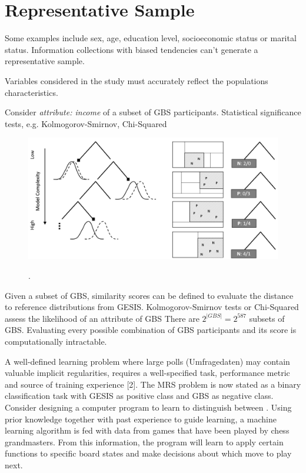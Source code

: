 \section{Representative Sample}

Some examples include sex, age, education level, socioeconomic status or marital status. Information collections with biased tendencies can't generate a representative sample.

Variables considered in the study must accurately reflect the populations characteristics. 

Consider \textit{attribute: income} of a subset of GBS participants. Statistical significance tests, e.g. Kolmogorov-Smirnov, Chi-Squared

\begin{figure}[ht]
	\begin{center}
		\includegraphics[scale=0.40,angle=0]{fig/tree3}
		\label{project}
		\caption{.}
	\end{center}
\end{figure}

Given a subset of GBS, similarity scores can be defined to evaluate the distance to reference distributions from GESIS. Kolmogorov-Smirnov tests or Chi-Squared assess the likelihood of an attribute of GBS  There are \(2^{|GBS|} = 2^{587}\) subsets of GBS. Evaluating every possible combination of GBS participants and its score is computationally intractable.

A well-deﬁned learning problem where large polls (Umfragedaten) may contain valuable implicit regularities, requires a well-speciﬁed task, performance metric and source of training experience [2]. The MRS problem is now stated as a binary classification task with GESIS as positive class and GBS as negative class. Consider designing a computer program to learn to distinguish between . Using prior knowledge together with past experience to guide learning, a machine learning algorithm
is fed with data from games that have been played by chess grandmasters. From this information, the program will learn to apply certain functions to speciﬁc board states and make decisions about which move to play next.

